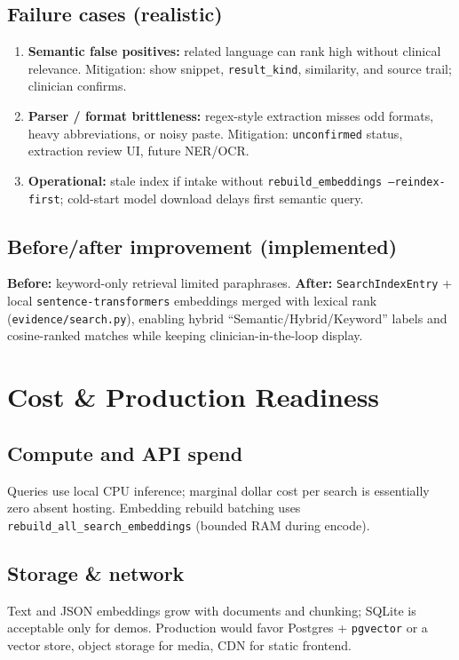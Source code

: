 \documentclass[11pt]{article}
\begin{document}
\subsection{Failure cases (realistic)}
\begin{enumerate}
  \item \textbf{Semantic false positives:} related language can rank high without clinical relevance. Mitigation: show snippet, \texttt{result\_kind}, similarity, and source trail; clinician confirms.
  \item \textbf{Parser / format brittleness:} regex-style extraction misses odd formats, heavy abbreviations, or noisy paste. Mitigation: \texttt{unconfirmed} status, extraction review UI, future NER/OCR.
  \item \textbf{Operational:} stale index if intake without \texttt{rebuild\_embeddings --reindex-first}; cold-start model download delays first semantic query.
\end{enumerate}

\subsection{Before/after improvement (implemented)}
\textbf{Before:} keyword-only retrieval limited paraphrases. \textbf{After:} \texttt{SearchIndexEntry} + local \texttt{sentence-transformers} embeddings merged with lexical rank (\texttt{evidence/search.py}), enabling hybrid ``Semantic/Hybrid/Keyword'' labels and cosine-ranked matches while keeping clinician-in-the-loop display.

\section{Cost \& Production Readiness}

\subsection{Compute and API spend}
Queries use local CPU inference; marginal dollar cost per search is essentially zero absent hosting. Embedding rebuild batching uses \texttt{rebuild\_all\_search\_embeddings} (bounded RAM during encode).

\subsection{Storage \& network}
Text and JSON embeddings grow with documents and chunking; SQLite is acceptable only for demos. Production would favor Postgres + \texttt{pgvector} or a vector store, object storage for media, CDN for static frontend.
\end{document}
